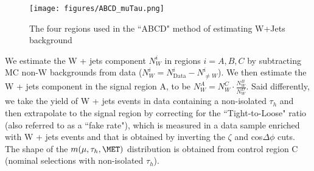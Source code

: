 \begin{figure}
\centering
\label{fig:ABCD_muTau}
\texttt{[image: figures/ABCD\_muTau.png]}
\caption{The four regions used in the ``ABCD" method of estimating W+Jets background}
\end{figure}

We estimate the W + jets component $N_{W}^{i}$ in regions $i=A,B,C$ by subtracting MC non-W backgrounds
from data ($N_{W}^{i}=N_{\textrm{Data}}^{i}-N_{\neq W}^{i}$). We then estimate the W + jets component in the signal region A, to
be $N_{W}^{A} = N_{W}^{C} \cdot \frac{N_{W}^{B}}{N_{W}^{D}}$. Said differently, we take the yield of W + jets events in data containing a non-isolated $\tau_{h}$ 
and then extrapolate to the signal region by correcting for the ``Tight-to-Loose" ratio (also referred to as a ``fake rate"), which is measured in a data sample 
enriched with W + jets events and that is obtained by inverting the $\zeta$ and cos$\Delta\phi$ cuts. The shape of the $m(\mu,\tau_{h},\MET)$ distribution is 
obtained from control region C (nominal selections with non-isolated $\tau_{h}$).

